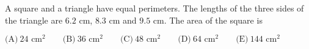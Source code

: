 

A square and a triangle have equal perimeters. The lengths of the three sides of the triangle are $6.2 \text{ cm}$, $8.3 \text{ cm}$ and $9.5 \text{ cm}$. The area of the square is

$\text{(A)}\ 24\text{ cm}^2 \qquad \text{(B)}\ 36\text{ cm}^2 \qquad \text{(C)}\ 48\text{ cm}^2 \qquad \text{(D)}\ 64\text{ cm}^2 \qquad \text{(E)}\ 144\text{ cm}^2$

